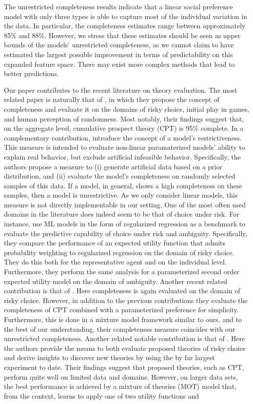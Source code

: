 \documentclass[11pt,a4paper]{article}
\theoremstyle{definition}
\begin{document}
The unrestricted completeness results indicate that a linear social preference model with only three types is able to capture most of the individual variation in the data. In particular, the completeness estimates range between approximately 85\% and 88\%. However, we stress that these estimates should be seen as upper bounds of the models' unrestricted completeness, as we cannot claim to have estimated the largest possible improvement in terms of predictability on this expanded feature space. There may exist more complex methods that lead to better predictions.

Our paper contributes to the recent literature on theory evaluation. The most related paper is naturally that of \cite{Fudenberg2021b}, in which they propose the concept of completeness and evaluate it on the domains of risky choice,  initial play in games, and human perception of randomness. Most notably, their findings suggest that, on the aggregate level, cumulative prospect theory (CPT) is 95\% complete. In a complementary contribution, \cite{Fudenberg2021a} introduce the concept of a model's restrictiveness. This measure is intended to evaluate non-linear paramaterized models' ability to explain real behavior, but exclude artificial infeasible behavior. Specifically, the authors propose a measure to (i) generate artificial data based on a prior distribution, and (ii) evaluate the model's completeness on randomly selected samples of this data. If a model, in general, shows a high completeness on these samples, then a model is unrestrictive. As we only consider linear models, this measure is not directly implementable in our setting. One of the most often used domains in the literature does indeed seem to be that of choice under risk. For instance, \cite{Peysakhovich2017} use ML models in the form of regularized regression as a benchmark to evaluate the predictive capability of choice under risk and ambiguity. Specifically, they compare the performance of an expected utility function that admits probability weighting to regularized regression on the domain of risky choice. They do this both for the representative agent and on the individual level. Furthermore, they perform the same analysis for a parameterized second order expected utility model on the domain of ambiguity. Another recent related contribution is that of \cite{Fudenberg2021c}. Here completeness is again evaluated on the domain of risky choice. However, in addition to the previous contributions they evaluate the completeness of CPT combined with a parameterized preference for simplicity. Furthermore, this is done in a mixture model framework similar to ours, and to the best of our understanding, their completeness measure coincides with our unrestricted completeness. Another related notable contribution is that of \cite{Peterson2021}. Here the authors provide the means to both evaluate proposed theories of risky choice and derive insights to discover new theories by using the by far largest experiment to date. Their findings suggest that proposed theories, such as CPT, perform quite well on limited data and domains. However, on larger data sets, the best performance is achieved by a mixture of theories (MOT) model that, from the context, learns to apply one of two utility functions and 
\end{document}
